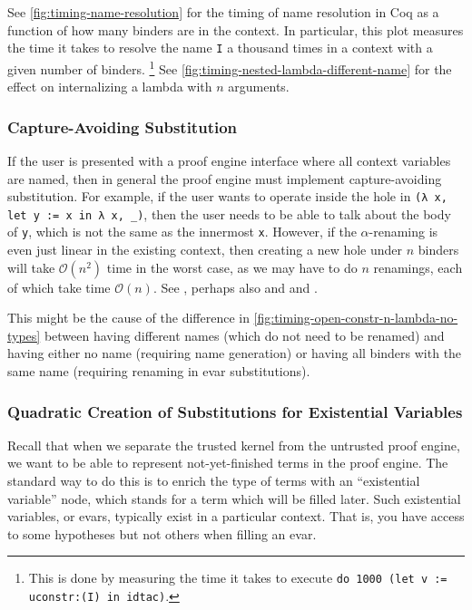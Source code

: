 See \autoref{fig:timing-name-resolution} for the timing of name resolution in Coq as a function of how many binders are in the context.
In particular, this plot measures the time it takes to resolve the name \texttt{I} a thousand times in a context with a given number of binders.%
\footnote{%
  This is done by measuring the time it takes to execute \texttt{do 1000 (let v := uconstr:(I) in idtac)}.
}
See \autoref{fig:timing-nested-lambda-different-name} for the effect on internalizing a lambda with $n$ arguments.



\subsubsection{Capture-Avoiding Substitution} \label{sec:perf:capture-avoiding-subst}
If the user is presented with a proof engine interface where all context variables are named, then in general the proof engine must implement capture-avoiding substitution.
For example, if the user wants to operate inside the hole in \texttt{(λ x, let y := x in λ x, _)}, then the user needs to be able to talk about the body of \texttt{y}, which is not the same as the innermost \texttt{x}.
However, if the $\alpha$-renaming is even just linear in the existing context, then creating a new hole under $n$ binders will take $\mathcal{O}(n^2)$ time in the worst case, as we may have to do $n$ renamings, each of which take time $\mathcal O(n)$.
See , perhaps also  and  and .

This might be the cause of the difference in \autoref{fig:timing-open-constr-n-lambda-no-types} between having different names (which do not need to be renamed) and having either no name (requiring name generation) or having all binders with the same name (requiring renaming in evar substitutions).


\subsubsection{Quadratic Creation of Substitutions for Existential Variables} \label{sec:perf:quadratic-evar-subst}
Recall  that when we separate the trusted kernel from the untrusted proof engine, we want to be able to represent not-yet-finished terms in the proof engine.
The standard way to do this is to enrich the type of terms with an ``existential variable'' node, which stands for a term which will be filled later.
Such existential variables, or evars, typically exist in a particular context.
That is, you have access to some hypotheses but not others when filling an evar.

